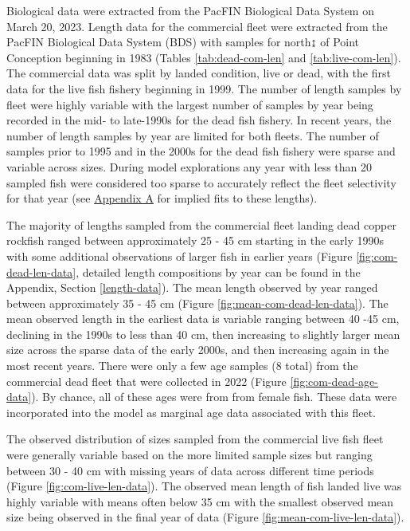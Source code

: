 \documentclass[11pt,
  english,
  letterpaper,
]{article}
\begin{document}
\hfill\break

Biological data were extracted from the PacFIN Biological Data System on March 20, 2023. Length data for the commercial fleet were extracted from the PacFIN Biological Data System (BDS) with samples for north↨ of Point Conception beginning in 1983 (Tables \ref{tab:dead-com-len} and \ref{tab:live-com-len}). The commercial data was split by landed condition, live or dead, with the first data for the live fish fishery beginning in 1999. The number of length samples by fleet were highly variable with the largest number of samples by year being recorded in the mid- to late-1990s for the dead fish fishery. In recent years, the number of length samples by year are limited for both fleets. The number of samples prior to 1995 and in the 2000s for the dead fish fishery were sparse and variable across sizes. During model explorations any year with less than 20 sampled fish were considered too sparse to accurately reflect the fleet selectivity for that year (see \protect\hyperlink{excluded-data}{Appendix A} for implied fits to these lengths).

The majority of lengths sampled from the commercial fleet landing dead copper rockfish ranged between approximately 25 - 45 cm starting in the early 1990s with some additional observations of larger fish in earlier years (Figure \ref{fig:com-dead-len-data}, detailed length compositions by year can be found in the Appendix, Section \ref{length-data}). The mean length observed by year ranged between approximately 35 - 45 cm (Figure \ref{fig:mean-com-dead-len-data}). The mean observed length in the earliest data is variable ranging between 40 -45 cm, declining in the 1990s to less than 40 cm, then increasing to slightly larger mean size across the sparse data of the early 2000s, and then increasing again in the most recent years. There were only a few age samples (8 total) from the commercial dead fleet that were collected in 2022 (Figure \ref{fig:com-dead-age-data}). By chance, all of these ages were from from female fish. These data were incorporated into the model as marginal age data associated with this fleet.

The observed distribution of sizes sampled from the commercial live fish fleet were generally variable based on the more limited sample sizes but ranging between 30 - 40 cm with missing years of data across different time periods (Figure \ref{fig:com-live-len-data}). The observed mean length of fish landed live was highly variable with means often below 35 cm with the smallest observed mean size being observed in the final year of data (Figure \ref{fig:mean-com-live-len-data}).
\end{document}
